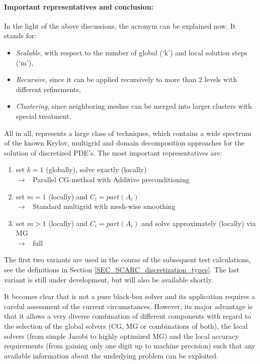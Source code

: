 \paragraph{Important representatives and conclusion:}
In the light of the above discussions, the acronym \scarc{} can be explained now. It stands for:
\begin{itemize}
\item {\it Scalable}, with respect to the number of global (`k') and local solution steps (`m'),
\item {\it Recursive}, since it can be applied recursively to more than 2 levels with different refinements,
\item {\it Clustering}, since neighboring meshes can be merged into larger clusters with special treatment.
\end{itemize}

All in all, \scarc{} represents a large class of techniques, which contains a wide spectrum of the known Krylov, multigrid and domain decomposition approaches for the solution of discretized PDE's. 
The most important representatives are:
\vspace{-0.1cm}
\begin{enumerate}
\item set $k=1$ (globally), solve exactly (locally)      \\
  $\longrightarrow$ \, { Parallel CG-method with Additive \ols{} preconditioning}
\item set $m=1$ (locally) and $C_i=part(A_i)$ \\
  $\longrightarrow$ \, { Standard multigrid with mesh-wise smoothing}
\item set $m > 1$ (locally) and $C_i=part(A_i)$ and solve approximately (locally) via MG\\
  $\longrightarrow$ \,  { full \scarc{}}
\end{enumerate}
The first two variants are used in the course of the subsequent test calculations, see the definitions in Section \ref{SEC_SCARC_discretization_types}. 
The last variant is still under development, but will also be available shortly.

It becomes clear that \scarc{} is not a pure black-box solver and its application requires a careful assessment of the current circumstances. However, its major advantage is that it allows a very diverse combination of different components with regard to the selection of the global solvers (CG, MG or combinations of both), the local solvers (from simple Jacobi to highly optimized MG) and the local accuracy requirements (from gaining only one digit up to machine precision) such that any available information about the underlying problem can be exploited.



